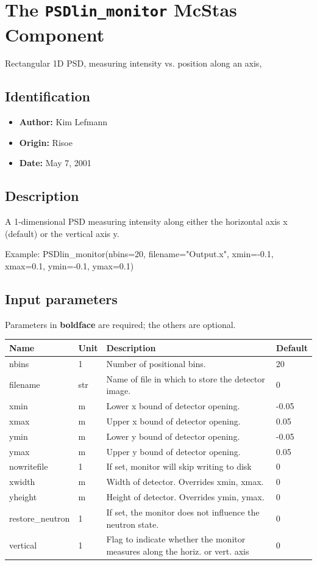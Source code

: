 \section{The \texttt{PSDlin\_monitor} McStas Component}
Rectangular 1D PSD, measuring intensity vs. position along an axis,

\subsection*{Identification}
\begin{itemize}
  \item \textbf{Author:} Kim Lefmann
  \item \textbf{Origin:} Risoe
  \item \textbf{Date:} May 7, 2001
\end{itemize}

\subsection*{Description}
A 1-dimensional PSD measuring intensity along either the horizontal axis x (default) or the vertical axis y.

Example: PSDlin\_monitor(nbins=20, filename="Output.x", xmin=-0.1, xmax=0.1, ymin=-0.1, ymax=0.1)

\subsection*{Input parameters}
Parameters in \textbf{boldface} are required; the others are optional.

\begin{longtable}{p{}p{}p{}p{}}
\toprule
\textbf{Name} & \textbf{Unit} & \textbf{Description} & \textbf{Default} \\
\midrule
\endhead
nbins & 1 & Number of positional bins. & 20 \\
filename & str & Name of file in which to store the detector image. & 0 \\
xmin & m & Lower x bound of detector opening. & -0.05 \\
xmax & m & Upper x bound of detector opening. & 0.05 \\
ymin & m & Lower y bound of detector opening. & -0.05 \\
ymax & m & Upper y bound of detector opening. & 0.05 \\
nowritefile & 1 & If set, monitor will skip writing to disk & 0 \\
xwidth & m & Width of detector. Overrides xmin, xmax. & 0 \\
yheight & m & Height of detector. Overrides ymin, ymax. & 0 \\
restore\_neutron & 1 & If set, the monitor does not influence the neutron state. & 0 \\
vertical & 1 & Flag to indicate whether the monitor measures along the horiz. or vert. axis & 0 \\
\bottomrule
\end{longtable}

